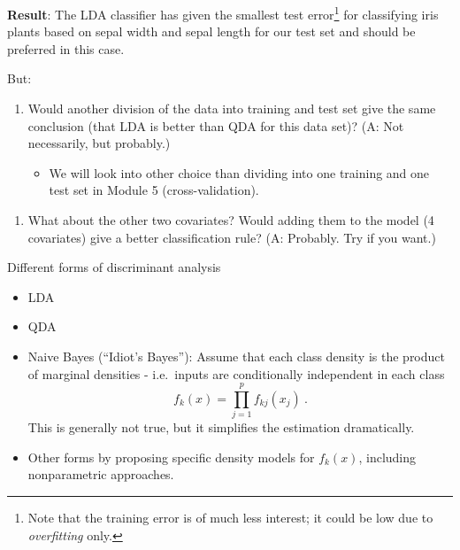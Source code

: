 \documentclass[10pt,ignorenonframetext,]{beamer}
\providecommand{\tightlist}{%
  \setlength{\itemsep}{0pt}\setlength{\parskip}{0pt}}
\begin{document}
\begin{frame}

\textbf{Result}: The LDA classifier has given the smallest test
error\footnote{Note that the training error is of much less interest; it could be low due to \emph{overfitting} only.}
for classifying iris plants based on sepal width and sepal length for
our test set and should be preferred in this case.

\vspace{2mm}

But:

\begin{enumerate}
\def\labelenumi{\arabic{enumi}.}
\tightlist
\item
  Would another division of the data into training and test set give the
  same conclusion (that LDA is better than QDA for this data set)? (A:
  Not necessarily, but probably.)

  \begin{itemize}
  \tightlist
  \item
    We will look into other choice than dividing into one training and
    one test set in Module 5 (cross-validation).
  \end{itemize}
\end{enumerate}

\vspace{2mm}

\begin{enumerate}
\def\labelenumi{\arabic{enumi}.}
\setcounter{enumi}{1}
\tightlist
\item
  What about the other two covariates? Would adding them to the model (4
  covariates) give a better classification rule? (A: Probably. Try if
  you want.)
\end{enumerate}

\end{frame}

\begin{frame}

\begin{block}{Different forms of discriminant analysis}

\begin{itemize}
\item
  LDA
\item
  QDA
\item
  Naive Bayes (``Idiot's Bayes''): Assume that each class density is the
  product of marginal densities - i.e.~inputs are conditionally
  independent in each class \[f_k(x)=\prod_{j=1}^p f_{kj}(x_j) \ .\]
  This is generally not true, but it simplifies the estimation
  dramatically.
\item
  Other forms by proposing specific density models for \(f_k(x)\),
  including nonparametric approaches.
\end{itemize}

\end{block}

\end{frame}
\end{document}
